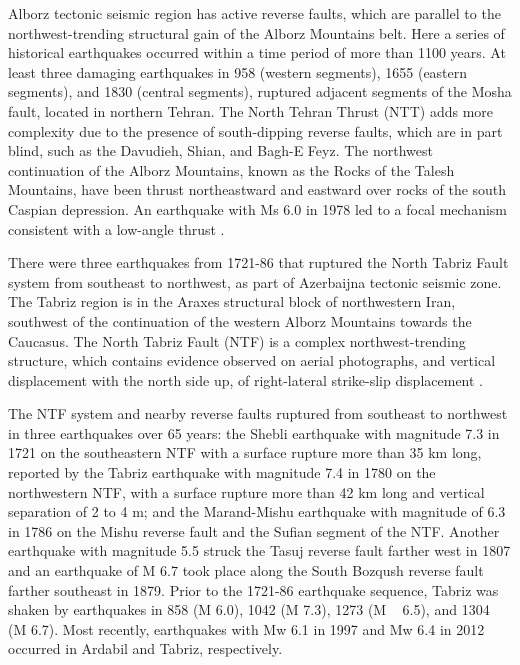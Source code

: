 \noindent
Alborz tectonic seismic region has active reverse faults, which are parallel to the northwest-trending structural gain of the Alborz Mountains belt. Here a series of historical earthquakes occurred within a time period of more than 1100 years. At least three damaging earthquakes in 958 (western segments), 1655 (eastern segments), and 1830 (central segments), ruptured adjacent segments of the Mosha fault, located in northern Tehran.  The North Tehran Thrust (NTT) adds more complexity due to the presence of south-dipping reverse faults, which are in part blind, such as the Davudieh, Shian, and Bagh-E Feyz.
The northwest continuation of the Alborz Mountains, known as the Rocks of the Talesh Mountains, have been thrust northeastward and eastward over rocks of the south Caspian depression. An earthquake with Ms 6.0 in 1978 led to a focal mechanism consistent with a low-angle thrust \citep{Berberian1999}. 

\noindent
There were three earthquakes from 1721-86 that ruptured the North Tabriz Fault system from southeast to northwest, as part of Azerbaijna tectonic seismic zone. The Tabriz region is in the Araxes structural block of northwestern Iran, southwest of the continuation of the western Alborz Mountains towards the Caucasus. The North Tabriz Fault (NTF) is a complex northwest-trending structure, which contains evidence observed on aerial photographs, and vertical displacement with the north side up, of right-lateral strike-slip displacement \citep{Berberian1999}.

The NTF system and nearby reverse faults ruptured from southeast to northwest in three earthquakes over 65 years: the Shebli earthquake with magnitude 7.3 in 1721 on the southeastern NTF with a surface rupture more than 35 km long, reported by \citet{Jones1834} the Tabriz earthquake with magnitude 7.4 in 1780 on the northwestern NTF, with a surface rupture more than 42 km long and vertical separation of 2 to 4 m; and the Marand-Mishu earthquake with magnitude of 6.3 in 1786 on the Mishu reverse fault and the Sufian segment of the NTF. Another earthquake with  magnitude 5.5 struck the Tasuj reverse fault farther west in 1807 and an earthquake of M 6.7 took place along the South Bozqush reverse fault farther southeast in 1879. Prior to the 1721-86 earthquake sequence, Tabriz was shaken by earthquakes in 858 (M 6.0), 1042 (M 7.3), 1273 (M ~ 6.5), and 1304 (M 6.7)\citep{Berberian1999}. Most recently, earthquakes with Mw 6.1 in 1997 and Mw 6.4 in 2012 occurred in Ardabil and Tabriz, respectively. 


